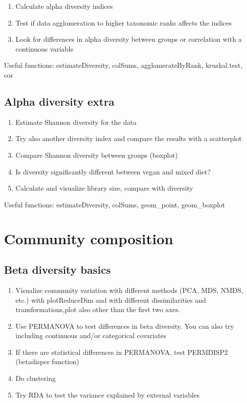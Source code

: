\documentclass[
]{book}
\providecommand{\tightlist}{%
  \setlength{\itemsep}{0pt}\setlength{\parskip}{0pt}}
\begin{document}
\begin{enumerate}
\def\labelenumi{\arabic{enumi}.}
\tightlist
\item
  Calculate alpha diversity indices
\item
  Test if data agglomeration to higher taxonomic ranks affects the indices
\item
  Look for differences in alpha diversity between groups or correlation with a continuous variable
\end{enumerate}

Useful functions: estimateDiversity, colSums, agglomerateByRank, kruskal.test, cor

\hypertarget{alpha-diversity-extra}{%
\subsection{Alpha diversity extra}\label{alpha-diversity-extra}}

\begin{enumerate}
\def\labelenumi{\arabic{enumi}.}
\tightlist
\item
  Estimate Shannon diversity for the data
\item
  Try also another diversity index and compare the results with a scatterplot
\item
  Compare Shannon diversity between groups (boxplot)
\item
  Is diversity significantly different between vegan and mixed diet?
\item
  Calculate and visualize library size, compare with diversity
\end{enumerate}

Useful functions: estimateDiversity, colSums, geom\_point, geom\_boxplot

\hypertarget{community-composition}{%
\section{Community composition}\label{community-composition}}

\hypertarget{beta-diversity-basics}{%
\subsection{Beta diversity basics}\label{beta-diversity-basics}}

\begin{enumerate}
\def\labelenumi{\arabic{enumi}.}
\tightlist
\item
  Visualize community variation with different methods (PCA, MDS, NMDS, etc.) with plotReduceDim and with different dissimilarities and transformations,plot also other than the first two axes.
\item
  Use PERMANOVA to test differences in beta diversity. You can also try including continuous and/or categorical covariates
\item
  If there are statistical differences in PERMANOVA, test PERMDISP2 (betadisper function)
\item
  Do clustering
\item
  Try RDA to test the variance explained by external variables
\end{enumerate}
\end{document}
